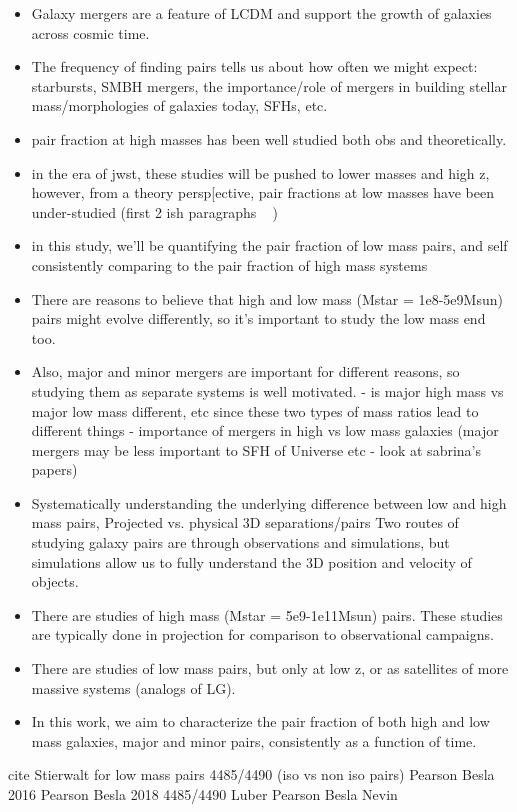 \documentclass[twocolumn]{aastex631}
\begin{document}
\begin{itemize}
    \item Galaxy mergers are a feature of LCDM and support the growth of galaxies across cosmic time.
    \item The frequency of finding pairs tells us about how often we might expect: starbursts, SMBH mergers, the importance/role of mergers in building stellar mass/morphologies of galaxies today, SFHs, etc. 
    \item pair fraction at high masses has been well studied both obs and theoretically.
    \item in the era of jwst, these studies will be pushed to lower masses and high z, however, from a theory persp[ective, pair fractions at low masses have been under-studied (first 2 ish paragraphs ~ )
    \item in this study, we'll be quantifying the pair fraction of low mass pairs, and self consistently comparing to the pair fraction of high mass systems
    \item There are reasons to believe that high and low mass (Mstar = 1e8-5e9Msun) pairs might evolve differently, so it's important to study the low mass end too. 
    \item Also, major and minor mergers are important for different reasons, so studying them as separate systems is well motivated.
        - is major high mass vs major low mass different, etc since these two types of mass ratios lead to different things 
        - importance of mergers in high vs low mass galaxies (major mergers may be less important to SFH of Universe etc - look at sabrina's papers)
    \item Systematically understanding the underlying difference between low and high mass pairs, Projected vs. physical 3D separations/pairs Two routes of studying galaxy pairs are through observations and simulations, but simulations allow us to fully understand the 3D position and velocity of objects. 
    \item There are studies of high mass (Mstar = 5e9-1e11Msun) pairs. These studies are typically done in projection for comparison to observational campaigns.
    \item There are studies of low mass pairs, but only at low z, or as satellites of more massive systems (analogs of LG). 
    \item In this work, we aim to characterize the pair fraction of both high and low mass galaxies, major and minor pairs, consistently as a function of time. 
\end{itemize}
cite Stierwalt for low mass pairs 4485/4490 (iso vs non iso pairs) 
Pearson Besla 2016 
Pearson Besla 2018 4485/4490
Luber Pearson Besla 
Nevin 
\end{document}
